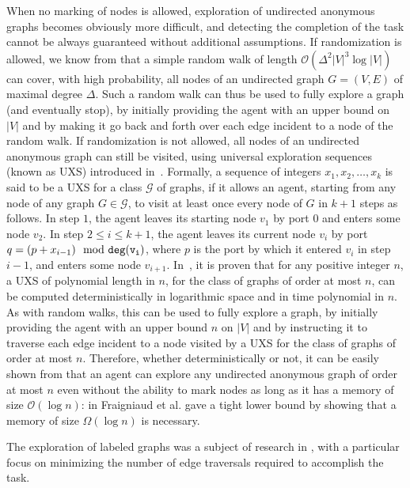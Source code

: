 \documentclass[11pt]{article}
\begin{document}
When no marking of nodes is allowed, exploration of undirected anonymous graphs becomes obviously more difficult, and detecting the completion of the task cannot be always guaranteed without additional assumptions. If randomization is allowed, we know from \cite{AleliunasKLLR79} that a simple random walk of length $\mathcal{O}(\Delta^2|V|^3\log |V|)$ can cover, with high probability, all nodes of an undirected graph $G=(V,E)$ of maximal degree $\Delta$. Such a random walk can thus be used to fully explore a graph (and eventually stop), by initially providing the agent with an upper bound on $|V|$ and by making it go back and forth over each edge incident to a node of the random walk. If randomization is not allowed, all nodes of an undirected anonymous graph can still be visited, using universal exploration sequences (known as UXS) introduced in~\cite{KOUCKY2002717}. Formally, a sequence of integers $x_1,x_2,\dots,x_k$ is said to be a UXS for a class $\mathcal{G}$ of graphs, if it allows an agent, starting from any node of any graph $G\in\mathcal{G}$, to visit at least once every node of $G$ in $k+1$ steps as follows. In step $1$, the agent leaves its starting node $v_1$ by port $0$ and enters some node $v_2$. In step $2\leq i \leq k+1$, the agent leaves its current node $v_i$ by port $q=(p+x_{i-1})\mod {\tt deg}(v_i)$, where $p$ is the port by which it entered $v_i$ in step $i-1$, and enters some node $v_{i+1}$. In~\cite{Reingold08}, it is proven that for any positive integer $n$, a UXS of polynomial length in $n$, for the class of graphs of order at most $n$, can be computed deterministically in logarithmic space and in time polynomial  in $n$. As with random walks, this can be used to fully explore a graph, by initially providing the agent with an upper bound $n$ on $|V|$ and by instructing it to traverse each edge incident to a node visited by a UXS for the class of graphs of order at most $n$. Therefore, whether deterministically or not, it can be easily shown from \cite{AleliunasKLLR79,Reingold08} that an agent can explore any undirected anonymous graph of order at most $n$ even without the ability to mark nodes as long as it has a memory of size $\mathcal{O}(\log n)$: in \cite{FraigniaudIPPP05} Fraigniaud et al. gave a tight lower bound by showing that a memory of size $\Omega(\log n)$ is necessary.

The exploration of labeled graphs was a subject of research in \cite{AlbersH00,AwerbuchBRS99,AwerbuchK98,BetkeRS95,DengP99,DuncanKK06,PanaiteP99}, with a particular focus on minimizing the number of edge traversals required to accomplish the task.
\end{document}
